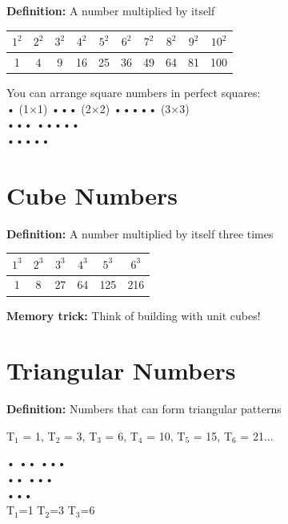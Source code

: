 \documentclass[a4paper,11pt]{article}
\begin{document}
\textbf{Definition:} A number multiplied by itself

\begin{center}
\begin{tabular}{|c|c|c|c|c|c|c|c|c|c|}
\hline
$1^2$ & $2^2$ & $3^2$ & $4^2$ & $5^2$ & $6^2$ & $7^2$ & $8^2$ & $9^2$ & $10^2$ \\
\hline
1 & 4 & 9 & 16 & 25 & 36 & 49 & 64 & 81 & 100 \\
\hline
\end{tabular}
\end{center}

\begin{tcolorbox}[colback=purple!5!white,colframe=purple!75!black,title=\textbf{Visual Pattern}]
You can arrange square numbers in perfect squares:
\\
• (1×1)  ••• (2×2)  ••••• (3×3)
\\  \quad\quad\quad ••• \quad\quad\quad •••••
\\ \quad\quad\quad\quad\quad\quad\quad •••••
\end{tcolorbox}

\section{Cube Numbers}

\textbf{Definition:} A number multiplied by itself three times

\begin{center}
\begin{tabular}{|c|c|c|c|c|c|}
\hline
$1^3$ & $2^3$ & $3^3$ & $4^3$ & $5^3$ & $6^3$ \\
\hline
1 & 8 & 27 & 64 & 125 & 216 \\
\hline
\end{tabular}
\end{center}

\textbf{Memory trick:} Think of building with unit cubes!

\section{Triangular Numbers}

\textbf{Definition:} Numbers that can form triangular patterns

\begin{center}
T$_1$ = 1, T$_2$ = 3, T$_3$ = 6, T$_4$ = 10, T$_5$ = 15, T$_6$ = 21...
\end{center}

\begin{tcolorbox}[colback=cyan!5!white,colframe=cyan!75!black,title=\textbf{The Pattern}]
\begin{center}
•  \quad ••  \quad •••
\\ \quad •• \quad •••
\\ \quad\quad\quad ••• 
\\T$_1$=1 \quad T$_2$=3 \quad T$_3$=6
\end{center}
\end{tcolorbox}
\end{document}

